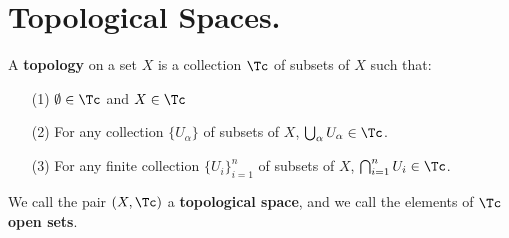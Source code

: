 
\section{Topological Spaces.}

\begin{definition}
    A \textbf{topology} on a set $X$ is a collection  $\Tc$ of subsets of  $X$ such that:
        \begin{enumerate}
            \item[(1)] $\emptyset \in \Tc$ and $X \in \Tc$

            \item[(2)] For any collection $\{U_{\alpha}\}$ of subsets of $X$,
                $\bigcup_{\alpha}{U_{\alpha}} \in \Tc$.

            \item[(3)]  For any finite collection $\{U_i\}_{i=1}^{n}$ of subsets of $X$,
                $\bigcap_{i=1}^{n}{U_i} \in \Tc$.
        \end{enumerate}
        We call the pair $(X,\Tc)$ a \textbf{topological space}, and we call the elements
        of  $\Tc$ \textbf{open sets}.
\end{definition}


